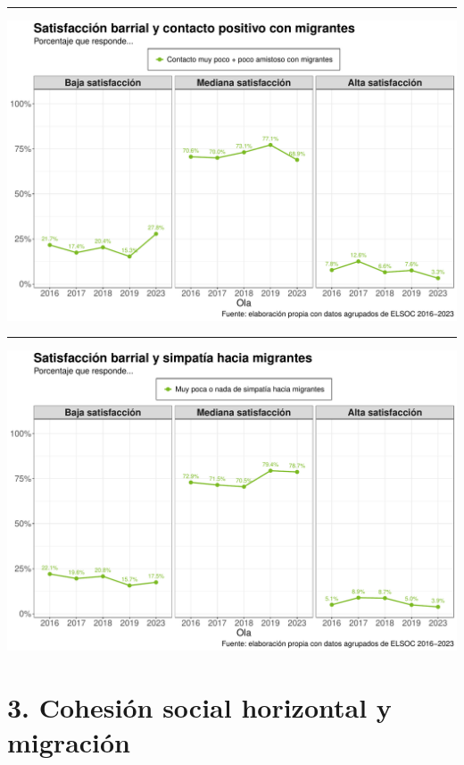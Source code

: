 \documentclass[
  spanish,
  letterpaper,
  DIV=11,
  numbers=noendperiod,
  oneside]{scrartcl}
\begin{document}
\begin{center}\rule{0.5\linewidth}{0.5pt}\end{center}

\begin{center}
\includegraphics[width=1\linewidth,height=\textheight,keepaspectratio]{cep_2025_files/figure-pdf/unnamed-chunk-8-1.pdf}
\end{center}

\begin{center}\rule{0.5\linewidth}{0.5pt}\end{center}

\begin{center}
\includegraphics[width=1\linewidth,height=\textheight,keepaspectratio]{cep_2025_files/figure-pdf/unnamed-chunk-9-1.pdf}
\end{center}

\section{3. Cohesión social horizontal y
migración}\label{cohesiuxf3n-social-horizontal-y-migraciuxf3n-3}
\end{document}
